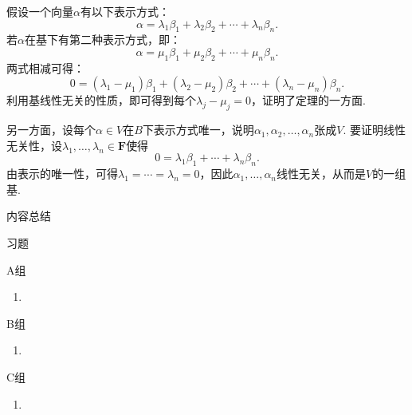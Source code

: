 假设一个向量$\alpha$有以下表示方式：\[\alpha=\lambda_1\beta_1+\lambda_2\beta_2+\cdots+\lambda_n\beta_n.\]
若$\alpha$在基下有第二种表示方式，即：\[\alpha=\mu_1\beta_1+\mu_2\beta_2+\cdots+\mu_n\beta_n.\]
两式相减可得：\[0=(\lambda_1-\mu_1)\beta_1+(\lambda_2-\mu_2)\beta_2+\cdots+(\lambda_n-\mu_n)\beta_n.\]
利用基线性无关的性质，即可得到每个$\lambda_j-\mu_j=0$，证明了定理的一方面.

另一方面，设每个$\alpha\in V$在$B$下表示方式唯一，说明$\alpha_1,\alpha_2,\ldots,\alpha_n$张成$V$.
要证明线性无关性，设$\lambda_1,\ldots,\lambda_n\in\mathbf{F}$使得\[0=\lambda_1\beta_1+\cdots+\lambda_n\beta_n.\]
由表示的唯一性，可得$\lambda_1=\cdots=\lambda_n=0$，因此$\alpha_1,\ldots,\alpha_n$线性无关，从而是$V$的一组基.

\vspace{2ex}
\centerline{\heiti \Large 内容总结}

\vspace{2ex}

\centerline{\heiti \Large 习题}
\vspace{2ex}
{\kaishu }
\begin{flushright}
    \kaishu

\end{flushright}
\centerline{\heiti A组}
\begin{enumerate}
    \item
\end{enumerate}
\centerline{\heiti B组}
\begin{enumerate}
    \item
\end{enumerate}
\centerline{\heiti C组}
\begin{enumerate}
    \item
\end{enumerate}
